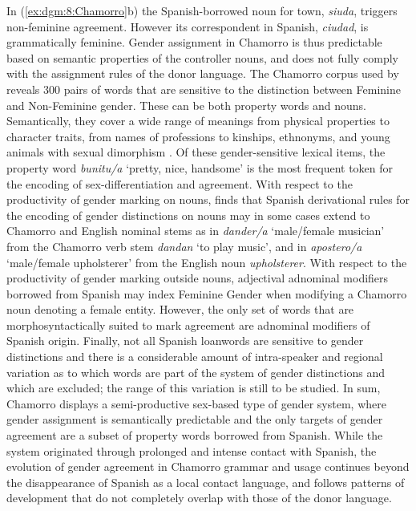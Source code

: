 \documentclass[output=collectionpaper]{langsci/langscibook}
\begin{document}
In (\ref{ex:dgm:8:Chamorro}b) the Spanish-borrowed noun for town, \textit{siuda}, triggers non-feminine agreement. However its correspondent in Spanish, \textit{ciudad}, is grammatically feminine. Gender assignment in Chamorro is thus predictable based on semantic properties of the controller nouns, and does not fully comply with the assignment rules of the donor language. The Chamorro corpus used by \citet{Stolz2012} reveals 300 pairs of words that are sensitive to the distinction between Feminine and Non-Feminine gender. These can be both property words and nouns. Semantically, they cover a wide range of meanings from physical properties to character traits, from names of professions to  kinships, ethnonyms, and young animals with sexual dimorphism \citep[][117]{Stolz2012}. Of these gender-sensitive lexical items, the property word \textit{bunitu/a} `pretty, nice, handsome' is the most frequent token for the encoding of sex-differentiation and agreement. With respect to the productivity of gender marking on nouns, \citet{Stolz2012} finds that Spanish derivational rules for the encoding of gender distinctions on nouns may in some cases extend to Chamorro and English nominal stems as in \textit{dander/a} `male/female musician' from the Chamorro verb stem \textit{dandan} `to play music', and in \textit{apostero/a} `male/female upholsterer' from the English noun \textit{upholsterer}. With respect to the productivity of gender marking outside nouns, adjectival adnominal modifiers borrowed from Spanish may index Feminine Gender when modifying a Chamorro noun denoting a female entity. However, the only set of words that are morphosyntactically suited to mark agreement are adnominal modifiers of Spanish origin. Finally, not all Spanish loanwords are sensitive to gender distinctions and there is a considerable amount of intra-speaker and regional variation as to which words are part of the system of gender distinctions and which are excluded; the range of this variation is still to be studied. In sum, Chamorro displays a semi-productive sex-based type of gender system, where gender assignment is semantically predictable and the only targets of gender agreement are a subset of property words borrowed from Spanish.
While the system originated through prolonged and intense contact with Spanish, the evolution of gender agreement in Chamorro grammar and usage continues beyond the disappearance of Spanish as a local contact language, and follows patterns of development that do not completely overlap with those of the donor language.
\end{document}
